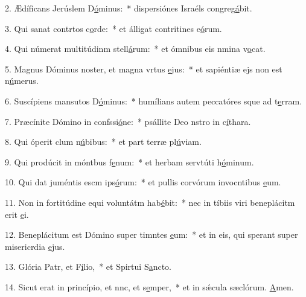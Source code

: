 2. Ædíficans Jerúslem D\uline{ó}minus:~* dispersiónes Israéls congreg\uline{á}bit.\par 
3. Qui sanat contrtos c\uline{o}rde:~* et álligat contritines e\uline{ó}rum.\par 
4. Qui númerat multitúdinm stell\uline{á}rum:~* et ómnibus eis nmina v\uline{o}cat.\par 
5. Magnus Dóminus noster, et magna vrtus \uline{e}jus:~* et sapiéntiæ ejs non est n\uline{ú}merus.\par 
6. Suscípiens mansutos D\uline{ó}minus:~* humílians autem peccatóres sque ad t\uline{e}rram.\par 
7. Præcínite Dómino in confssi\uline{ó}ne:~* psállite Deo nstro in c\uline{í}thara.\par 
8. Qui óperit clum n\uline{ú}bibus:~* et part terræ pl\uline{ú}viam.\par 
9. Qui prodúcit in móntbus f\uline{e}num:~* et herbam servtúti h\uline{ó}minum.\par 
10. Qui dat juméntis escm ips\uline{ó}rum:~* et pullis corvórum invocntibus \uline{e}um.\par 
11. Non in fortitúdine equi voluntátm hab\uline{é}bit:~* nec in tíbiis viri beneplácitm erit \uline{e}i.\par 
12. Beneplácitum est Dómino super timntes \uline{e}um:~* et in eis, qui sperant super misericrdia \uline{e}jus.\par 
13. Glória Patr, et F\uline{í}lio,~* et Spirtui S\uline{a}ncto.\par 
14. Sicut erat in princípio, et nnc, et s\uline{e}mper,~* et in sǽcula sæclórum. \uline{A}men.\par 
